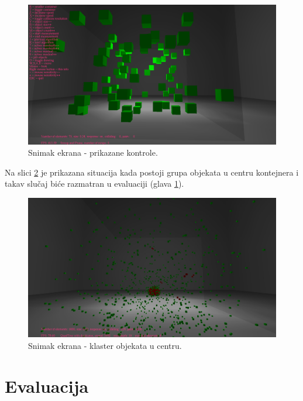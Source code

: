 \documentclass[12pt,oneside]{memoir}
\begin{document}
\begin{figure}[h!]
	\centerfloat
	\includegraphics[scale=0.3]{ssinfo.png}
	\caption{Snimak ekrana - prikazane kontrole.}
	\label{fig:ssinfo}
\end{figure}

\noindent Na slici \ref{fig:ssyank} je prikazana situacija kada postoji grupa objekata u centru kontejnera i takav slučaj biće 
razmatran u evaluaciji (glava \ref{sec:evaluacija}).

\begin{figure}[h!]
	\centerfloat
	\includegraphics[scale=0.3]{ssyank.jpg}
	\caption{Snimak ekrana - klaster objekata u centru.}
	\label{fig:ssyank}
\end{figure}

\chapter{Evaluacija}
\label{sec:evaluacija}
\end{document}
